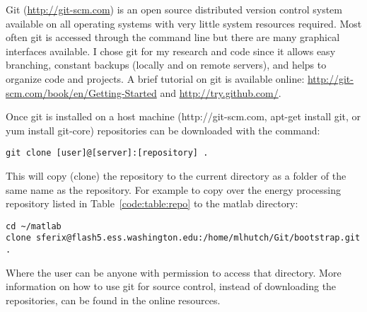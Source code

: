 Git (\href{http://git-scm.com}{http://git-scm.com}) is an open source distributed version control system available on all operating systems with very little system resources required.
Most often git is accessed through the command line but there are many graphical interfaces available.
I chose git for my research and code since it allows easy branching, constant backups (locally and on remote servers), and helps to organize code and projects.
A brief tutorial on git is available online: \href{http://git-scm.com/book/en/Getting-Started}{http://git-scm.com/book/en/Getting-Started} and \href{http://try.github.com/}{http://try.github.com/}.

Once git is installed on a host machine (http://git-scm.com, apt-get install git, or yum install git-core) repositories can be downloaded with the command:

\begin{verbatim}
git clone [user]@[server]:[repository] .
\end{verbatim}

This will copy (clone) the repository to the current directory as a folder of the same name as the repository. 
For example to copy over the energy processing repository listed in Table~\ref{code:table:repo} to the matlab directory:

\begin{verbatim}
cd ~/matlab
clone sferix@flash5.ess.washington.edu:/home/mlhutch/Git/bootstrap.git .
\end{verbatim}

Where the user can be anyone with permission to access that directory.
More information on how to use git for source control, instead of downloading the repositories, can be found in the online resources.

